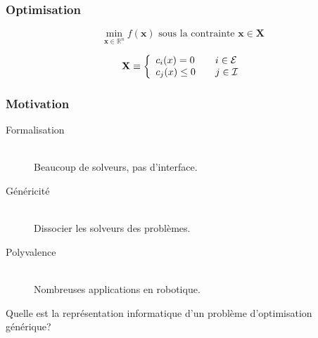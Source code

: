 \documentclass[14pt,utf8,hyperref={pdfpagelabels=false}]{beamer}
\begin{document}
\begin{slideDecision}
  \begin{changeleftmargin}{1.1cm}
    \frametitle{Optimisation}


    \begin{equation*}
      \min_{\mathbf{x} \in \mathbb{R}^n} f(\mathbf{x})%
      \text{ sous la contrainte } \mathbf{x} \in \mathbf{X}
    \end{equation*}

    \begin{equation*}
      \mathbf{X} \equiv \left\{
      \begin{array}{l l}
        c_i (x) = 0    & \quad i \in \mathcal{E} \\
        c_j (x) \leq 0 & \quad j \in \mathcal{I} \\
      \end{array} \right.
    \end{equation*}

  \end{changeleftmargin}
\end{slideDecision}

\begin{slideDecision}
  \begin{changeleftmargin}{1.1cm}
    \frametitle{Motivation}


    \begin{center}
      \begin{description}
        \item[Formalisation]~\\
          Beaucoup de solveurs, pas d'interface.
        \item[Généricité]~\\
          Dissocier les solveurs des problèmes.
        \item[Polyvalence]~\\
          Nombreuses applications en robotique.
      \end{description}
    \end{center}
    \vspace{1cm}
    Quelle est la \alert{représentation informatique} d'un problème
    d'optimisation générique?
  \end{changeleftmargin}
\end{slideDecision}
\end{document}

